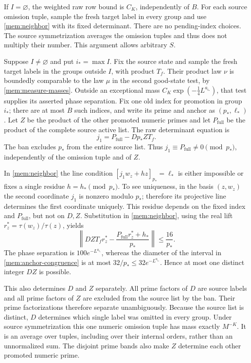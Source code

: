 If $I=\varnothing$, the weighted raw row bound is $C_K$, independently
of $B$. For each source omission tuple, sample the fresh target label
in every group and use \eqref{mem:neighbor} with its fixed determinant.
There are no pending-index choices. The source symmetrization averages
the omission tuples and thus does not multiply their number. This
argument allows arbitrary $S$.

Suppose $I\ne\varnothing$ and put $i_* =\max I$. Fix the source state
and sample the fresh target labels in the groups outside $I$, with
product $T_f$. Their product law $\nu$ is boundedly comparable to the
law $\mu$ in the second good-state test, by
\eqref{mem:measure-masses}. Outside an exceptional mass
$C_K\exp(-\tfrac14L^{a_{i_*}})$, that test supplies its asserted phase
separation. Fix one old index for promotion in group $i_*$; there are
at most $B$ such indices, and write its prime and anchor as
$(p_*,\ell_*)$. Let $Z$ be the product of the other promoted numeric
primes and let $P_{\mathrm{full}}$ be the product of the complete source
active list. The raw determinant equation is
\begin{equation}\label{mem:dirty-determinant}
 j_1=P_{\mathrm{full}}-Dp_*ZT_f.
\end{equation}
The ban excludes $p_*$ from the entire source list. Thus
$j_1\equiv P_{\mathrm{full}}\ne0\pmod{p_*}$, independently of the
omission tuple and of $Z$.

In \eqref{mem:neighbor} the line condition
$[j_1w_z+hz]_{p_*}=\ell_*$ is either impossible or fixes a single
residue $h=h_*\pmod{p_*}$. To see uniqueness, in the basis
$(z,w_z)$ the second coordinate $j_1$ is nonzero modulo $p_*$;
therefore its projective line determines the first coordinate
uniquely. This residue depends on the fixed index and
$P_{\mathrm{full}}$, but not on $D,Z$. Substitution in
\eqref{mem:neighbor}, using the real lift
$r_z^*=\tau(w_z)/\tau(z)$, yields
\begin{equation}\label{mem:anchor-congruence}
 \left\|DZ T_f r_z^*
       -\frac{P_{\mathrm{full}}r_z^*+h_*}{p_*}\right\|
       \le\frac{16}{p_*}.
\end{equation}
The phase separation is $100e^{-L^{a_{i_*}}}$, whereas the diameter
of the interval in \eqref{mem:anchor-congruence} is at most
$32/p_*\le32e^{-L^{a_{i_*}}}$. Hence at most one distinct integer
$DZ$ is possible.

This also determines $D$ and $Z$ separately. All prime factors of $D$
are source labels and all prime factors of $Z$ are excluded from the
source list by the ban. Their prime factorizations therefore separate
unambiguously. Because the source list is distinct, $D$ determines
which single label was omitted in every group. Under source
symmetrization this one numeric omission tuple has mass exactly
$M^{-K}$. It is an average over tuples, including over their internal
orders, rather than an unnormalized sum. The disjoint prime bands
also make $Z$ determine each other promoted numeric prime.

